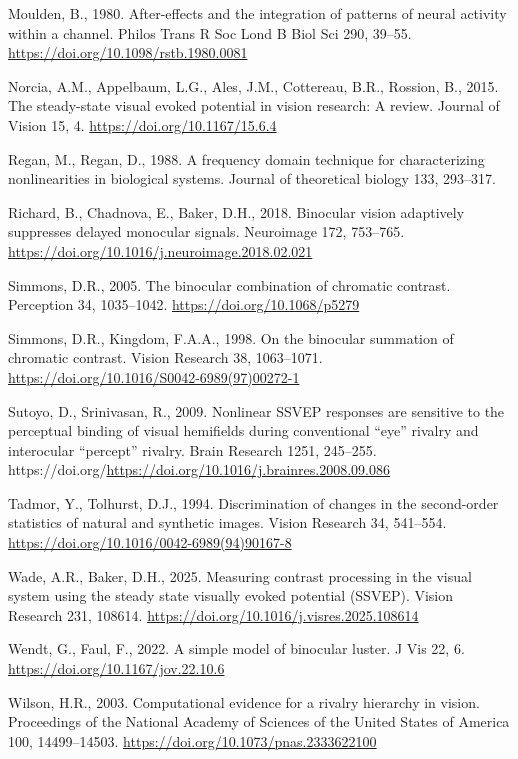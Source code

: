 \documentclass[
  12pt,
]{article}
\newlength{\cslhangindent}
\newenvironment{CSLReferences}[2] %
 {\begin{list}{}{%
  \setlength{\itemindent}{0pt}
  \setlength{\leftmargin}{0pt}
  \setlength{\parsep}{0pt}
  \ifodd #1
   \setlength{\leftmargin}{\cslhangindent}
   \setlength{\itemindent}{-1\cslhangindent}
  \fi
  \setlength{\itemsep}{#2\baselineskip}}}
 {\end{list}}
\begin{document}
\begin{CSLReferences}{1}{0}
Moulden, B., 1980. After-effects and the integration of patterns of
neural activity within a channel. Philos Trans R Soc Lond B Biol Sci
290, 39--55. \url{https://doi.org/10.1098/rstb.1980.0081}

Norcia, A.M., Appelbaum, L.G., Ales, J.M., Cottereau, B.R., Rossion, B.,
2015. The steady-state visual evoked potential in vision research: A
review. Journal of Vision 15, 4. \url{https://doi.org/10.1167/15.6.4}

Regan, M., Regan, D., 1988. A frequency domain technique for
characterizing nonlinearities in biological systems. Journal of
theoretical biology 133, 293--317.

Richard, B., Chadnova, E., Baker, D.H., 2018. Binocular vision
adaptively suppresses delayed monocular signals. Neuroimage 172,
753--765. \url{https://doi.org/10.1016/j.neuroimage.2018.02.021}

Simmons, D.R., 2005. The binocular combination of chromatic contrast.
Perception 34, 1035--1042. \url{https://doi.org/10.1068/p5279}

Simmons, D.R., Kingdom, F.A.A., 1998. On the binocular summation of
chromatic contrast. Vision Research 38, 1063--1071.
\url{https://doi.org/10.1016/S0042-6989(97)00272-1}

Sutoyo, D., Srinivasan, R., 2009. Nonlinear SSVEP responses are
sensitive to the perceptual binding of visual hemifields during
conventional {``eye''} rivalry and interocular {``percept''} rivalry.
Brain Research 1251, 245--255.
https://doi.org/\url{https://doi.org/10.1016/j.brainres.2008.09.086}

Tadmor, Y., Tolhurst, D.J., 1994. Discrimination of changes in the
second-order statistics of natural and synthetic images. Vision Research
34, 541--554. \url{https://doi.org/10.1016/0042-6989(94)90167-8}

Wade, A.R., Baker, D.H., 2025. Measuring contrast processing in the
visual system using the steady state visually evoked potential (SSVEP).
Vision Research 231, 108614.
\url{https://doi.org/10.1016/j.visres.2025.108614}

Wendt, G., Faul, F., 2022. A simple model of binocular luster. J Vis 22,
6. \url{https://doi.org/10.1167/jov.22.10.6}

Wilson, H.R., 2003. Computational evidence for a rivalry hierarchy in
vision. Proceedings of the National Academy of Sciences of the United
States of America 100, 14499--14503.
\url{https://doi.org/10.1073/pnas.2333622100}

\end{CSLReferences}
\end{document}
